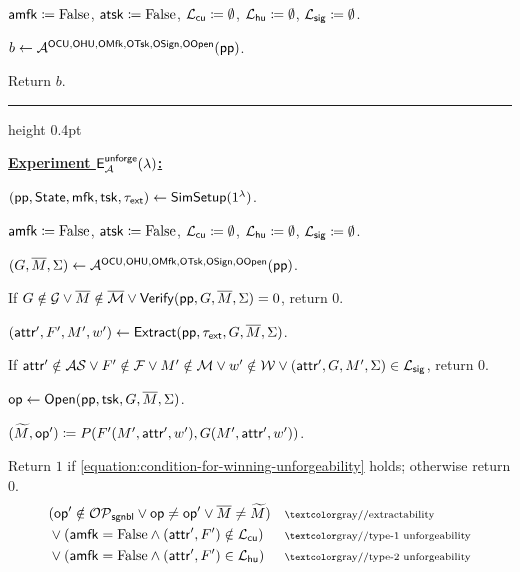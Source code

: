 \begin{experiment}
$\mathsf{amfk} \coloneqq \mathrm{False}$, $\mathsf{atsk} \coloneqq \mathrm{False}$,
$\mathcal{L}_\mathsf{cu} \coloneqq \emptyset$, $\mathcal{L}_\mathsf{hu} \coloneqq \emptyset$, $\mathcal{L}_\mathsf{sig} \coloneqq \emptyset$.

$b \gets \mathcal{A}^{\mathsf{OCU}, \mathsf{OHU}, \mathsf{OMfk}, \mathsf{OTsk}, \mathsf{OSign}, \mathsf{OOpen}}(\mathsf{pp})$.

Return $b$.

\vspace{1ex}
\hrule height 0.4pt

\medskip
\underline{\textbf{Experiment $\mathsf{E}^{\mathsf{unforge}}_{\mathcal{A}}(\lambda)$:}}

$(\mathsf{pp}, \mathsf{State}, \mathsf{mfk}, \mathsf{tsk}, \tau_\mathsf{ext}) \gets \mathsf{SimSetup}(1^\lambda)$.

$\mathsf{amfk} \coloneqq \mathrm{False}$, $\mathsf{atsk} \coloneqq \mathrm{False}$,
$\mathcal{L}_\mathsf{cu} \coloneqq \emptyset$, $\mathcal{L}_\mathsf{hu} \coloneqq \emptyset$, $\mathcal{L}_\mathsf{sig} \coloneqq \emptyset$.

$(G, \overline{M}, \Sigma) \gets
\mathcal{A}^{\mathsf{OCU}, \mathsf{OHU}, \mathsf{OMfk}, \mathsf{OTsk}, \mathsf{OSign}, \mathsf{OOpen}}(\mathsf{pp})$.

If $G \notin \mathcal{G}
\lor \overline{M} \notin \overline{\mathcal{M}}
\lor \mathsf{Verify}(\mathsf{pp}, G, \overline{M}, \Sigma) = 0$,
return $0$.

$(\mathsf{attr}', F', M', w') \gets \mathsf{Extract}(\mathsf{pp}, \tau_\mathsf{ext}, G, \overline{M}, \Sigma)$.

If $\mathsf{attr}' \notin \mathcal{AS}
\lor F' \notin \mathcal{F}
\lor M' \notin \mathcal{M}
\lor w' \notin \mathcal{W}
\lor (\mathsf{attr}', G, M', \Sigma) \in \mathcal{L}_\mathsf{sig}$,
return $0$.

$\mathsf{op} \gets \mathsf{Open}(\mathsf{pp}, \mathsf{tsk}, G, \overline{M}, \Sigma)$.

$(\widetilde{M}, \mathsf{op}') \coloneqq P(F'(M', \mathsf{attr}', w'), G(M', \mathsf{attr}', w'))$.

Return $1$ if \eqref{equation:condition-for-winning-unforgeability} holds;
otherwise return $0$.
\begin{equation}\label{equation:condition-for-winning-unforgeability}
\begin{aligned}
& (\op' \notin \OpeningSetSignable
	\lor \op \neq \op'
	\lor \tM \neq \tildeM)
	&& \cmmt{extractability}
	\\
& \lor (\amfk = \False \land (\attr', F') \notin \LCU)
	&& \cmmt{type-1 unforgeability}
	\\
& \lor (\amfk = \False \land (\attr', F') \in \LHU)
	&& \cmmt{type-2 unforgeability}
\end{aligned}
\end{equation}

\end{experiment}
